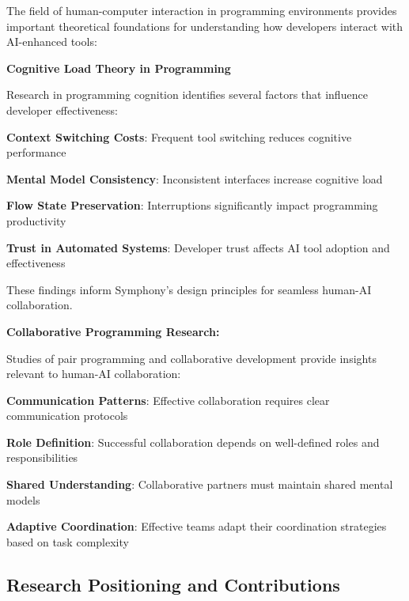 The field of human-computer interaction in programming environments provides important theoretical foundations for understanding how developers interact with AI-enhanced tools:

\begin{alertbox}
\textbf{Cognitive Load Theory in Programming}

Research in programming cognition identifies several factors that influence developer effectiveness:

\begin{compactlist}
    \item \textbf{Context Switching Costs}: Frequent tool switching reduces cognitive performance
    \item \textbf{Mental Model Consistency}: Inconsistent interfaces increase cognitive load
    \item \textbf{Flow State Preservation}: Interruptions significantly impact programming productivity
    \item \textbf{Trust in Automated Systems}: Developer trust affects AI tool adoption and effectiveness
\end{compactlist}

These findings inform Symphony's design principles for seamless human-AI collaboration.
\end{alertbox}

\textbf{Collaborative Programming Research:}

Studies of pair programming and collaborative development provide insights relevant to human-AI collaboration:

\begin{compactlist}
    \item \textbf{Communication Patterns}: Effective collaboration requires clear communication protocols
    \item \textbf{Role Definition}: Successful collaboration depends on well-defined roles and responsibilities
    \item \textbf{Shared Understanding}: Collaborative partners must maintain shared mental models
    \item \textbf{Adaptive Coordination}: Effective teams adapt their coordination strategies based on task complexity
\end{compactlist}

\subsection{Research Positioning and Contributions}
\label{subsec:research-positioning}

